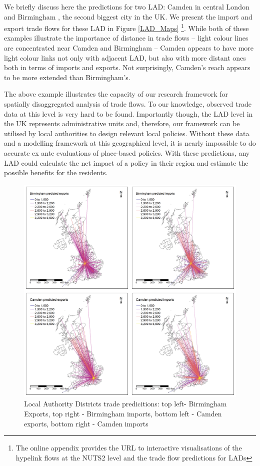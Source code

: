 \documentclass[]{interact}
\theoremstyle{plain}%
\theoremstyle{definition}
\theoremstyle{remark}
\begin{document}
We briefly discuss here the predictions for two LAD: Camden in central
London and Birmingham , the second biggest city in the UK. We present
the import and export trade flows for these LAD in Figure \ref{LAD_Maps}
\footnote{The online appendix provides the URL to interactive
  visualisations of the hypelink flows at the NUTS2 level and the trade
  flow predictions for LADs}. While both of these examples illustrate
the importance of distance in trade flows -- light colour lines are
concentrated near Camden and Birmingham -- Camden appears to have more
light colour links not only with adjacent LAD, but also with more
distant ones both in terms of imports and exports. Not surprisingly,
Camden's reach appears to be more extended than Birmingham's.

The above example illustrates the capacity of our research framework for
spatially disaggregated analysis of trade flows. To our knowledge,
observed trade data at this level is very hard to be found. Importantly
though, the LAD level in the UK represents administrative units and,
therefore, our framework can be utilised by local authorities to design
relevant local policies. Without these data and a modelling framework at
this geographical level, it is nearly impossible to do accurate ex ante
evaluations of place-based policies. With these predictions, any LAD
could calculate the net impact of a policy in their region and estimate
the possible benefits for the residents.

\begin{figure}[p]
\includegraphics[width=1\linewidth]{figures/Predictions} \caption{\label{LAD_Maps}Local Authority Districts trade predicitions: top left- Birmingham Exports, top right - Birmingham imports, bottom left - Camden exports, bottom right - Camden imports}\label{fig:unnamed-chunk-14}
\end{figure}
\end{document}
